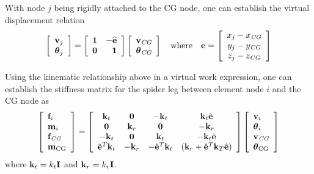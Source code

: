 With node $j$ being rigidly attached to the CG node,
one can establish the virtual displacement relation
%
\begin{equation}
\left[\begin{array}{c}
{\bf v}_j \\ {\boldsymbol{\theta}}_j
\end{array}\right] =
\left[\begin{array}{rr}
{\bf 1} & -\widehat{{\bf e}} \\
{\bf 0} & {\bf 1}
\end{array}\right]
\left[\begin{array}{c}
{\bf v}_\textit{CG} \\ {\boldsymbol{\theta}}_\textit{CG}
\end{array}\right]
\quad\text{where}\quad {\bf e} =
\left[\begin{array}{c}
x_j - x_\textit{CG} \\
y_j - y_\textit{CG} \\
z_j - z_\textit{CG}
\end{array}\right]
\end{equation}

Using the kinematic relationship above in a virtual work expression, one
can establish the stiffness matrix for the spider leg between element node $i$
and the CG node as
%
\begin{equation}
\label{eq:spider stiffness}
\left[\begin{array}{l}
{\bf f}_i \\ {\bf m}_i \\ {\bf f}_\textit{CG} \\ {\bf m}_\text{CG}
\end{array}\right] =
\left[\begin{array}{cccc}
 {\bf k}_t & {\bf 0}   & -{\bf k}_t &  {\bf k}_t \hat{{\bf e}} \\
 {\bf 0}   & {\bf k}_r &  {\bf 0}   & -{\bf k}_r \\
-{\bf k}_t & {\bf 0}   &  {\bf k}_t & -{\bf k}_t \hat{{\bf e}} \\
 \hat{{\bf e}}^T {\bf k}_t & -{\bf k}_r &
-\hat{{\bf e}}^T {\bf k}_t &
 ({\bf k}_r + \hat{{\bf e}}^T{\bf k}_T \hat{{\bf e}})
\end{array}\right]
\left[\begin{array}{l}
{\bf v}_i \\ {\boldsymbol{\theta}}_i \\ {\bf v}_\textit{CG} \\ {\boldsymbol{\theta}}_\text{CG}
\end{array}\right]
\end{equation}
%
where ${\bf k}_t = k_t{\bf I}$ and ${\bf k}_r = k_r{\bf I}$.

